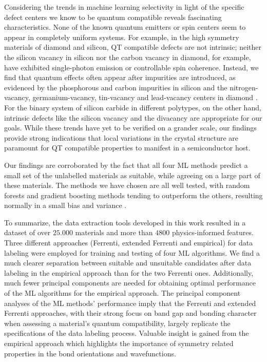 \documentclass[superscriptaddress,unsortedaddress,
 amsmath,amssymb,
 aps,
]{revtex4-2}
\begin{document}
Considering the trends in machine learning selectivity in light of the specific defect centers we know to be quantum compatible reveals fascinating characteristics. None of the known quantum emitters or spin centers seem to appear in completely uniform systems. For example, in the high symmetry materials of diamond and silicon, QT compatible defects are not intrinsic; neither the silicon vacancy in silicon nor the carbon vacancy in diamond, for example,  have exhibited single-photon emission or controllable spin coherence. Instead, we find that quantum effects often appear after impurities are introduced, as evidenced by the phosphorous and carbon impurities in silicon \cite{He2019,Redjem2020} and the nitrogen-vacancy, germanium-vacancy, tin-vacancy and lead-vacancy centers in diamond \cite{Thiering2020}. 
For the binary system of silicon carbide in different polytypes, on the other hand, intrinsic defects like the silicon vacancy and the divacancy are appropriate for our goals. 
While these trends have yet to be verified on a grander scale, our findings provide strong indications that local variations in the crystal structure are paramount for QT compatible properties to manifest in a semiconductor host. 

Our findings are corroborated by the fact that all four ML methods predict a small set of the unlabelled materials as suitable, while agreeing on a large part of these materials. 
The methods we have chosen are all well tested, with random forests and gradient boosting methods tending to outperform the others, resulting normally in a small bias and variance \cite{Hastie2009,Mehta2019,Murphy2012}. 

To summarize, the data extraction tools developed in this work resulted in a dataset of over $25.000$ materials and more than $4800$ physics-informed features. Three different approaches (Ferrenti, extended Ferrenti and empirical) for data labeling were employed for training and testing of four ML algorithms. 
We find a much clearer separation between suitable and unsuitable candidates after data labeling in the empirical approach than for the two Ferrenti ones. 
Additionally, much fewer principal components are needed for obtaining optimal performance of the ML algorithms for the empirical approach. 
The principal component analyses of the ML methods' performance imply that the Ferrenti and extended Ferrenti approaches, with their strong focus on band gap and bonding character when assessing a material's quantum compatibility, largely replicate the specifications of the data labeling process. 
Valuable insight is gained from the empirical approach which highlights the importance of symmetry related properties in the bond orientations and wavefunctions. 
\end{document}
